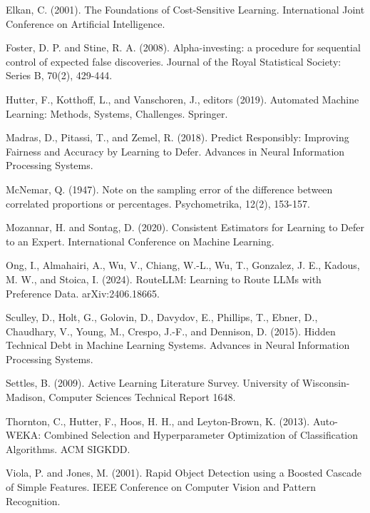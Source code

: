 Elkan, C. (2001). The Foundations of Cost-Sensitive Learning.
International Joint Conference on Artificial Intelligence.

Foster, D. P. and Stine, R. A. (2008). Alpha-investing: a procedure for
sequential control of expected false discoveries. Journal of the Royal
Statistical Society: Series B, 70(2), 429-444.

Hutter, F., Kotthoff, L., and Vanschoren, J., editors (2019). Automated
Machine Learning: Methods, Systems, Challenges. Springer.

Madras, D., Pitassi, T., and Zemel, R. (2018). Predict Responsibly:
Improving Fairness and Accuracy by Learning to Defer. Advances in Neural
Information Processing Systems.

McNemar, Q. (1947). Note on the sampling error of the difference between
correlated proportions or percentages. Psychometrika, 12(2), 153-157.

Mozannar, H. and Sontag, D. (2020). Consistent Estimators for Learning
to Defer to an Expert. International Conference on Machine Learning.

Ong, I., Almahairi, A., Wu, V., Chiang, W.-L., Wu, T., Gonzalez, J. E.,
Kadous, M. W., and Stoica, I. (2024). RouteLLM: Learning to Route LLMs
with Preference Data. arXiv:2406.18665.

Sculley, D., Holt, G., Golovin, D., Davydov, E., Phillips, T., Ebner,
D., Chaudhary, V., Young, M., Crespo, J.-F., and Dennison, D. (2015).
Hidden Technical Debt in Machine Learning Systems. Advances in Neural
Information Processing Systems.

Settles, B. (2009). Active Learning Literature Survey. University of
Wisconsin-Madison, Computer Sciences Technical Report 1648.

Thornton, C., Hutter, F., Hoos, H. H., and Leyton-Brown, K. (2013).
Auto-WEKA: Combined Selection and Hyperparameter Optimization of
Classification Algorithms. ACM SIGKDD.

Viola, P. and Jones, M. (2001). Rapid Object Detection using a Boosted
Cascade of Simple Features. IEEE Conference on Computer Vision and
Pattern Recognition.
